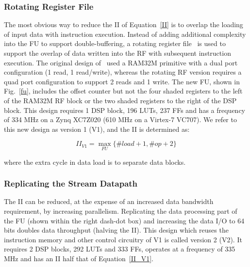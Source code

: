 \subsubsection{Rotating Register File}
The most obvious way to reduce the II of Equation~\ref{II} is to overlap the loading of input data with instruction execution. 
Instead of adding additional complexity into the FU to support double-buffering, a rotating register file~\cite{rau1992register} is used to support the overlap of data written into the RF with subsequent instruction execution.
The original design of~\cite{li2016area} used a RAM32M primitive with a dual port configuration (1 read, 1 read/write), whereas the rotating RF version requires a quad port configuration to support 2 reads and 1 write.
The new FU, shown in Fig.~\ref{fu}, includes the offset counter but not the four shaded registers to the left of the RAM32M RF block or the two shaded registers to the right of the DSP block. This design requires 1 DSP block, 196 LUTs, 237 FFs and has a frequency of 334 MHz on a Zynq XC7Z020 (610 MHz on a Virtex-7 VC707).  
We refer to this new design as version 1 (V1), and the II is determined as: 

\begin{equation}
	II_{V1} =  \max_{FU} \{\#load + 1, \#op + 2\}
	\label{II_V1}
\end{equation}

\noindent where the extra cycle in data load is to separate data blocks.

\subsubsection{Replicating the Stream Datapath}
The II can be reduced, at the expense of an increased data bandwidth requirement, by increasing parallelism.
Replicating the data processing part of the FU (shown within the right dash-dot box) and increasing the data I/O to 64 bits doubles data throughput (halving the II).
This design which reuses the instruction memory and other control circuitry of V1 is called version 2 (V2). It requires 2 DSP blocks, 292 LUTs and 333 FFs, operates at a frequency of 335 MHz and has an II half that of Equation~\ref{II_V1}.

